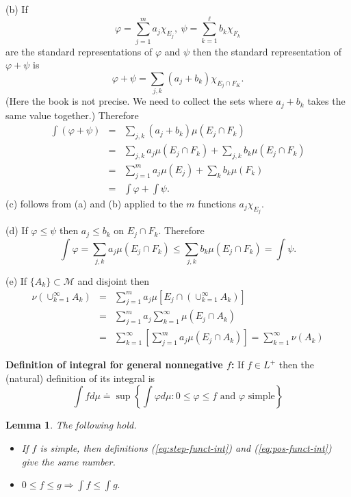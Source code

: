 \documentclass[12pt]{report}
\newtheorem{lemma}[theorem]{Lemma}
\begin{document}
\smallskip
\noindent
(b)  If
\[
\varphi = \sum^m_{j=1} a_j \chi_{E_j}, \ \psi = \sum^\ell_{k=1} b_k
\chi_{F_k}
\] are the standard representations of $\varphi$ and $\psi$ then the
standard representation of $\varphi + \psi$ is
\[
\varphi + \psi = \sum_{j,k} (a_j + b_k) \chi_{E_j \cap F_K}.
\] 
(Here the book is not precise. We need to collect 
the sets where $a_j + b_k$ takes the same value together.)
Therefore
\begin{eqnarray*}
\int(\varphi + \psi) &=& \sum_{j, k} (a_j + b_k) \mu(E_j \cap F_k)\\
&=& \sum_{j, k} a_j \mu(E_j \cap F_k) + \sum_{j, k} b_k \mu(E_j \cap
F_k)\\ &=& \sum^m_{j=1} a_j \mu(E_j) + \sum_k b_k \mu(F_k)\\ &=&
\int \varphi + \int  \psi.
\end{eqnarray*}
\smallskip
\noindent
(c) follows from (a) and (b) applied to the $m$ functions $a_j
\chi_{E_j}$.

\smallskip
\noindent(d)  If $\varphi \le \psi$ then $a_j \le b_k$ on $E_j \cap F_k$. 
Therefore
\[
\int \varphi  = \sum_{j, k} a_j \mu(E_j \cap F_k) \le \sum_{j, k} b_k
\mu(E_j \cap F_k) = \int \psi.
\]

\smallskip
\noindent
(e)  If $\{A_k\} \subset \mathcal{M}$ and disjoint then
\begin{eqnarray*}
\nu \left ( {\cup}^\infty_{k=1} A_k\right ) &=&
\sum^m_{j=1} a_j
\mu \left [ E_j
\cap \left ( {\cup}^\infty_{k=1} A_k \right )
\right ]\\ 
&=& \sum^m_{j=1} a_j \sum^\infty_{k=1} \mu(E_j
\cap A_k)\\
 &=&
\sum^\infty_{k=1} \left [ \sum^m_{j=1} a_j \mu(E_j \cap A_k) \right ] =
\sum^\infty_{k=1} \nu(A_k)
\end{eqnarray*}

\noindent
\textbf{Definition of integral for general nonnegative $f$:} If $f \in L^+$
then the (natural) definition of its integral is
\begin{equation}
\label{eq:pos-funct-int}
\int f d \mu \doteq \sup\left \{\int \varphi d \mu: 0 \le \varphi \le f
\mbox{ and }
\varphi \mbox{ simple}\right \}
\end{equation}


\begin{lemma} The following hold.

\begin{itemize}
\item[(a)]   If $f$ is simple, then definitions
(\ref{eq:step-funct-int}) and (\ref{eq:pos-funct-int}) give the
same number.
\item[(b)]  $0 \le f \le g \Longrightarrow \int f \le \int g.$
\end{itemize} 
\end{lemma}
\end{document}
